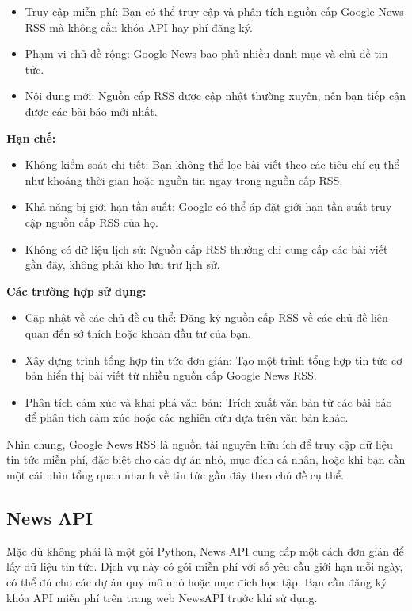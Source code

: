 \begin{itemize}
\item
  Truy cập miễn phí: Bạn có thể truy cập và phân tích nguồn cấp Google News RSS mà không cần khóa API hay phí đăng ký.
\item
  Phạm vi chủ đề rộng: Google News bao phủ nhiều danh mục và chủ đề tin tức.
\item
  Nội dung mới: Nguồn cấp RSS được cập nhật thường xuyên, nên bạn tiếp cận được các bài báo mới nhất.
\end{itemize}

\textbf{Hạn chế:}

\begin{itemize}
\item
  Không kiểm soát chi tiết: Bạn không thể lọc bài viết theo các tiêu chí cụ thể như khoảng thời gian hoặc nguồn tin ngay trong nguồn cấp RSS.
\item
  Khả năng bị giới hạn tần suất: Google có thể áp đặt giới hạn tần suất truy cập nguồn cấp RSS của họ.
\item
  Không có dữ liệu lịch sử: Nguồn cấp RSS thường chỉ cung cấp các bài viết gần đây, không phải kho lưu trữ lịch sử.
\end{itemize}

\textbf{Các trường hợp sử dụng:}

\begin{itemize}
\item
  Cập nhật về các chủ đề cụ thể: Đăng ký nguồn cấp RSS về các chủ đề liên quan đến sở thích hoặc khoản đầu tư của bạn.
\item
  Xây dựng trình tổng hợp tin tức đơn giản: Tạo một trình tổng hợp tin tức cơ bản hiển thị bài viết từ nhiều nguồn cấp Google News RSS.
\item
  Phân tích cảm xúc và khai phá văn bản: Trích xuất văn bản từ các bài báo để phân tích cảm xúc hoặc các nghiên cứu dựa trên văn bản khác.
\end{itemize}

Nhìn chung, Google News RSS là nguồn tài nguyên hữu ích để truy cập dữ liệu tin tức miễn phí, đặc biệt cho các dự án nhỏ, mục đích cá nhân, hoặc khi bạn cần một cái nhìn tổng quan nhanh về tin tức gần đây theo chủ đề cụ thể.

\subsection{News API}

Mặc dù không phải là một gói Python, News API cung cấp một cách đơn giản để lấy dữ liệu tin tức. Dịch vụ này có gói miễn phí với số yêu cầu giới hạn mỗi ngày, có thể đủ cho các dự án quy mô nhỏ hoặc mục đích học tập. Bạn cần đăng ký khóa API miễn phí trên trang web NewsAPI trước khi sử dụng.

